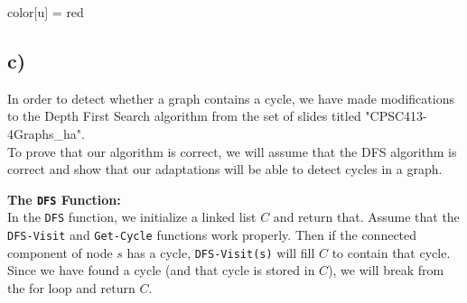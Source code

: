 \documentclass{article}
\begin{document}
\begin{algorithm}[H]
\DontPrintSemicolon
\SetAlgoLined
{} %

 {
    \;
    color[u] = red\\
}
\end{algorithm}


\begin{algorithm}[H]
\DontPrintSemicolon
\SetAlgoLined
{} %

 {
    \;
   
}
\end{algorithm}



\subsection*{c)}
In order to detect whether a graph contains a cycle, we have made modifications to the Depth First Search algorithm from the set of slides titled "CPSC413-4Graphs\_ha". \\
To prove that our algorithm is correct, we will assume that the DFS algorithm is correct and show that our adaptations will be able to detect cycles in a graph.

\textbf{The \texttt{DFS} Function:}\\
In the \texttt{DFS} function, we initialize a linked list $C$ and return that. Assume that the \texttt{DFS-Visit} and \texttt{Get-Cycle} functions work properly. Then if the connected component of node $s$ has a cycle, \texttt{DFS-Visit(s)} will fill $C$ to contain that cycle. Since we have found a cycle (and that cycle is stored in $C$), we will break from the for loop and return $C$.
\end{document}
